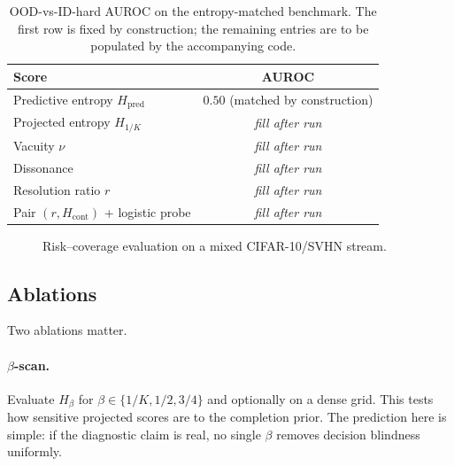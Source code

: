 \documentclass[11pt]{article}
\newcommand{\1}{\mathbf{1}}
\newcommand{\placeholder}[1]{\textit{#1}}
\begin{document}
\begin{table}[t]
\centering
\caption{OOD-vs-ID-hard AUROC on the entropy-matched benchmark. The first row is fixed by construction; the remaining entries are to be populated by the accompanying code.}
\label{tab:auroc}
\begin{tabular}{lc}
\toprule
Score & AUROC \\
\midrule
Predictive entropy $H_{\mathrm{pred}}$ & $0.50$ (matched by construction) \\
Projected entropy $H_{1/K}$ & \placeholder{fill after run} \\
Vacuity $\nu$ & \placeholder{fill after run} \\
Dissonance & \placeholder{fill after run} \\
Resolution ratio $r$ & \placeholder{fill after run} \\
Pair $(r,H_{\mathrm{cont}})$ + logistic probe & \placeholder{fill after run} \\
\bottomrule
\end{tabular}
\end{table}

\begin{figure}[t]
    \centering
    \caption{Risk--coverage evaluation on a mixed CIFAR-10/SVHN stream.}
    \label{fig:risk-coverage}
\end{figure}

\subsection{Ablations}

Two ablations matter.

\paragraph{$\beta$-scan.}
Evaluate $H_\beta$ for $\beta\in\{1/K,1/2,3/4\}$ and optionally on a dense grid. This tests how sensitive projected scores are to the completion prior. The prediction here is simple: if the diagnostic claim is real, no single $\beta$ removes decision blindness uniformly.
\end{document}
